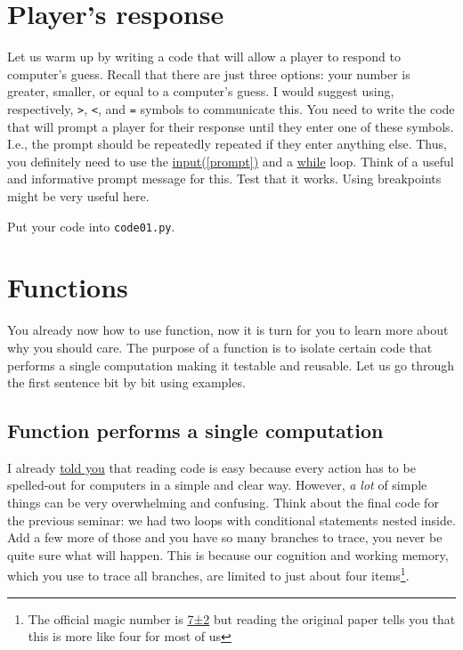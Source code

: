 \documentclass[
]{book}
\begin{document}
\hypertarget{guess-the-number-players-response}{%
\section{Player's response}\label{guess-the-number-players-response}}

Let us warm up by writing a code that will allow a player to respond to computer's guess. Recall that there are just three options: your number is greater, smaller, or equal to a computer's guess. I would suggest using, respectively, \texttt{\textgreater{}}, \texttt{\textless{}}, and \texttt{=} symbols to communicate this. You need to write the code that will prompt a player for their response until they enter one of these symbols. I.e., the prompt should be repeatedly repeated if they enter anything else. Thus, you definitely need to use the \href{https://docs.python.org/3/library/functions.html\#input}{input({[}prompt{]})} and a \protect\hyperlink{while-loop}{while} loop. Think of a useful and informative prompt message for this. Test that it works. Using breakpoints might be very useful here.

Put your code into \texttt{code01.py}.

\hypertarget{function}{%
\section{Functions}\label{function}}

You already now how to use function, now it is turn for you to learn more about why you should care. The purpose of a function is to isolate certain code that performs a single computation making it testable and reusable. Let us go through the first sentence bit by bit using examples.

\hypertarget{function-performs-a-single-computation}{%
\subsection{Function performs a single computation}\label{function-performs-a-single-computation}}

I already \protect\hyperlink{programming-tips}{told you} that reading code is easy because every action has to be spelled-out for computers in a simple and clear way. However, \emph{a lot} of simple things can be very overwhelming and confusing. Think about the final code for the previous seminar: we had two loops with conditional statements nested inside. Add a few more of those and you have so many branches to trace, you never be quite sure what will happen. This is because our cognition and working memory, which you use to trace all branches, are limited to just about four items\footnote{The official magic number is \href{https://en.wikipedia.org/wiki/The_Magical_Number_Seven,_Plus_or_Minus_Two}{7±2} but reading the original paper tells you that this is more like four for most of us}.
\end{document}
